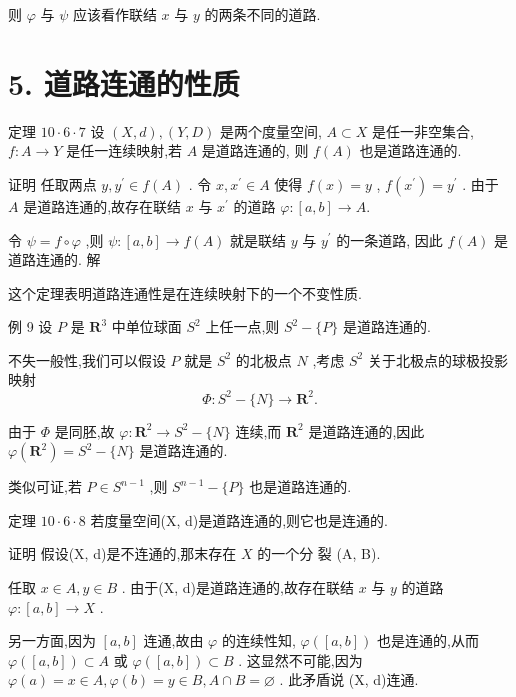 则 $\varphi$ 与 $\psi$ 应该看作联结 $x$ 与 $y$ 的两条不同的道路.

\section*{5. 道路连通的性质}

定理 ${10} \cdot  6 \cdot  7$ 设 $\left( {X,d}\right) ,\left( {Y,D}\right)$ 是两个度量空间, $A \subset  X$ 是任一非空集合, $f : A \rightarrow  Y$ 是任一连续映射,若 $A$ 是道路连通的, 则 $f\left( A\right)$ 也是道路连通的.

证明 任取两点 $y,{y}^{\prime } \in  f\left( A\right)$ . 令 $x,{x}^{\prime } \in  A$ 使得 $f\left( x\right)  = y$ , $f\left( {x}^{\prime }\right)  = {y}^{\prime }$ . 由于 $A$ 是道路连通的,故存在联结 $x$ 与 ${x}^{\prime }$ 的道路 $\varphi  : \left\lbrack  {a,b}\right\rbrack   \rightarrow  A.$

令 $\psi  = f \circ  \varphi$ ,则 $\psi  : \left\lbrack  {a,b}\right\rbrack   \rightarrow  f\left( A\right)$ 就是联结 $y$ 与 ${y}^{\prime }$ 的一条道路, 因此 $f\left( A\right)$ 是道路连通的. 解

这个定理表明道路连通性是在连续映射下的一个不变性质.

例 9 设 $P$ 是 ${\mathbf{R}}^{3}$ 中单位球面 ${S}^{2}$ 上任一点,则 ${S}^{2} - \{ P\}$ 是道路连通的.

不失一般性,我们可以假设 $P$ 就是 ${S}^{2}$ 的北极点 $N$ ,考虑 ${S}^{2}$ 关于北极点的球极投影映射
$$\Phi  : {S}^{2} - \{ N\}  \rightarrow  {\mathbf{R}}^{2}.$$

由于 $\Phi$ 是同胚,故 $\varphi  : {\mathbf{R}}^{2} \rightarrow  {S}^{2} - \{ N\}$ 连续,而 ${\mathbf{R}}^{2}$ 是道路连通的,因此 $\varphi \left( {\mathbf{R}}^{2}\right)  = {S}^{2} - \{ N\}$ 是道路连通的.

类似可证,若 $P \in  {S}^{n - 1}$ ,则 ${S}^{n - 1} - \{ P\}$ 也是道路连通的.

定理 ${10} \cdot  6 \cdot  8$ 若度量空间(X, d)是道路连通的,则它也是连通的.

证明 假设(X, d)是不连通的,那末存在 $X$ 的一个分 裂 (A, B).

任取 $x \in  A,y \in  B$ . 由于(X, d)是道路连通的,故存在联结 $x$ 与 $y$ 的道路 $\varphi  : \left\lbrack  {a,b}\right\rbrack   \rightarrow  X$ .

另一方面,因为 $\left\lbrack  {a,b}\right\rbrack$ 连通,故由 $\varphi$ 的连续性知, $\varphi \left( \left\lbrack  {a,b}\right\rbrack  \right)$ 也是连通的,从而 $\varphi \left( \left\lbrack  {a,b}\right\rbrack  \right)  \subset  A$ 或 $\varphi \left( \left\lbrack  {a,b}\right\rbrack  \right)  \subset  B$ . 这显然不可能,因为 $\varphi \left( a\right)  = x \in  A,\varphi \left( b\right)  = y \in  B,A \cap  B = \varnothing$ . 此矛盾说 (X, d)连通.

